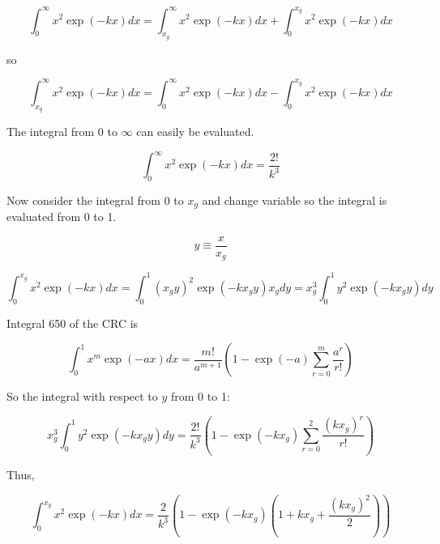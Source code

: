 \documentclass[letterpaper,12pt]{article}
\begin{document}
\begin{equation} \label{eq:09}
\int_{0}^{\infty} x^{2} \exp(-kx) dx = \int_{x_{g}}^{\infty} x^{2} \exp(-kx) dx + \int_{0}^{x_{g}} x^{2} \exp(-kx) dx
\end{equation}

\noindent so

\begin{equation} \label{eq:10}
\int_{x_{g}}^{\infty} x^{2} \exp(-kx) dx = \int_{0}^{\infty} x^{2} \exp(-kx) dx - \int_{0}^{x_{g}} x^{2} \exp(-kx) dx
\end{equation}

The integral from 0 to $\infty$ can easily be evaluated.

\begin{equation} \label{eq:11}
\int_{0}^{\infty} x^{2} \exp(-kx) dx = \frac{2!}{k^{3}}
\end{equation}

Now consider the integral from 0 to $x_{g}$ and change variable so the integral is evaluated from 0 to 1.

\begin{equation} \label{eq:12}
y \equiv \frac{x}{x_{g}}
\end{equation}

\begin{equation} \label{eq:13}
\int_{0}^{x_{g}} x^{2} \exp(-kx) dx = \int_{0}^{1} (x_{g}y)^{2} \exp(-kx_{g}y) x_{g} dy
= x_{g}^{3} \int_{0}^{1} y^{2} \exp(-kx_{g}y) dy
\end{equation}

Integral 650 of the CRC \cite{} is

\begin{equation} \label{eq:14}
\int_{0}^{1} x^{m} \exp(-ax) dx = \frac{m!}{a^{m+1}} \left( 1 - \exp(-a) \sum_{r = 0}^{m} \frac{a^{r}}{r!} \right)
\end{equation}

So the integral with respect to $y$ from 0 to 1:

\begin{equation} \label{eq:15}
x_{g}^{3} \int_{0}^{1} y^{2} \exp(-kx_{g}y) dy = \frac{2!}{k^{3}} \left( 1 - \exp(-kx_{g}) \sum_{r = 0}^{2} \frac{ (kx_{g})^{r} }{r!} \right)
\end{equation}

Thus,

\begin{equation} \label{eq:16}
\int_{0}^{x_{g}} x^{2} \exp(-kx) dx = \frac{2}{k^{3}} \left( 1 - \exp(-kx_{g}) \left(1 + kx_{g} + \frac{ (kx_{g})^{2} }{2} \right) \right)
\end{equation}
\end{document}
